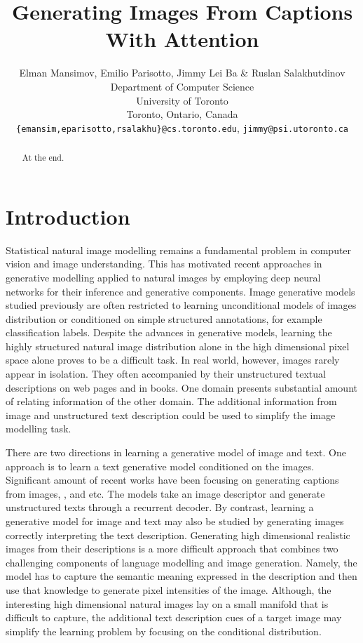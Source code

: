 \documentclass{article} %
\title{Generating Images From Captions\\ With Attention}
\author{
Elman Mansimov, Emilio Parisotto, Jimmy Lei Ba \& Ruslan Salakhutdinov\\
Department of Computer Science\\
University of Toronto\\
Toronto, Ontario, Canada \\
\texttt{\{emansim,eparisotto,rsalakhu\}@cs.toronto.edu}, \texttt{jimmy@psi.utoronto.ca}
}
\begin{document}
\maketitle

\begin{abstract}
At the end.
\end{abstract}

\section{Introduction}

Statistical natural image modelling remains a fundamental problem in computer vision and image understanding. This has motivated recent approaches in generative modelling applied to natural images by employing deep neural networks for their inference and generative components. Image generative models studied previously are often restricted to learning unconditional models of images distribution or conditioned on simple structured annotations, for example classification labels. Despite the advances in generative models, learning the highly structured natural image distribution alone in the high dimensional pixel space alone proves to be a difficult task. In real world, however, images rarely appear in isolation. They often accompanied by their unstructured textual descriptions on web pages and in books. One domain presents substantial amount of relating information of the other domain. The additional information from image and unstructured text description could be used to simplify the image modelling task.

There are two directions in learning a generative model of image and text.  One approach is to learn a text generative model conditioned on the images. Significant amount of recent works have been focusing on generating captions from images\citep{karpathy_captions}, \citep{xu_captions}, \citep{kiros_captions} and etc. The models take an image descriptor and generate unstructured texts through a recurrent decoder. By contrast, learning a generative model for image and text may also be studied by generating images correctly interpreting the text description. 
Generating high dimensional realistic images from their descriptions is a more difficult approach that combines two challenging components of language modelling and image generation. Namely, the model has to capture the semantic meaning expressed in the description and then use that knowledge to generate pixel intensities of the image. Although, the interesting high dimensional natural images lay on a small manifold that is difficult to capture, the additional text description cues of a target image may simplify the learning problem by focusing on the conditional distribution.   
\end{document}
